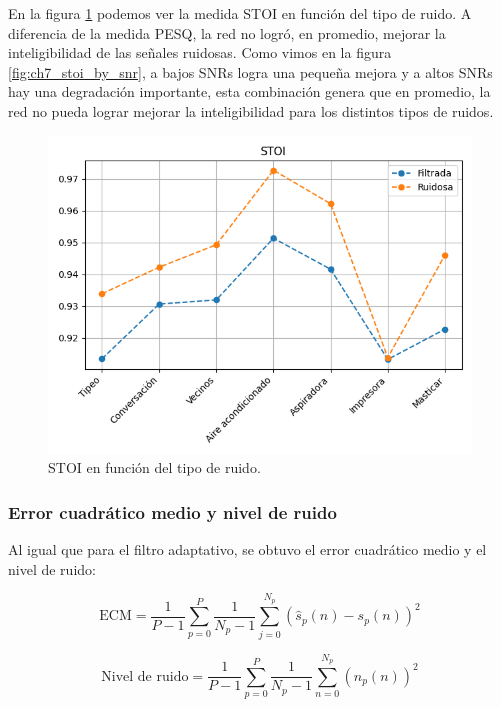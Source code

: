 En la figura \ref{fig:ch7_stoi_by_noise_type} podemos ver la medida STOI en función del tipo de ruido. A diferencia de la medida PESQ, la red no logró, en promedio, mejorar la inteligibilidad de las señales ruidosas. Como vimos en la figura \ref{fig:ch7_stoi_by_snr}, a bajos SNRs logra una pequeña mejora y a altos SNRs hay una degradación importante, esta combinación genera que en promedio, la red no pueda lograr mejorar la inteligibilidad para los distintos tipos de ruidos.

\begin{figure}
	\centering
	\centerline{\includegraphics[scale=0.8]{images/ch7/stoi_by_noise_type.png}}
	\caption{STOI en función del tipo de ruido.}
	\label{fig:ch7_stoi_by_noise_type}
\end{figure} 


\subsubsection{Error cuadrático medio y nivel de ruido}

Al igual que para el filtro adaptativo, se obtuvo el error cuadrático medio y el nivel de ruido:

\begin{equation*}
	\text{ECM} = \frac{1}{P-1} \sum_{p=0}^{P} \frac{1}{N_p-1} \sum_{j=0}^{N_p} (\hat{s}_p(n) - s_p(n))^2
\end{equation*}

\begin{equation*}
	\text{Nivel de ruido} = \frac{1}{P-1} \sum_{p=0}^{P} \frac{1}{N_p-1} \sum_{n=0}^{N_p} (n_p(n))^2
\end{equation*}

